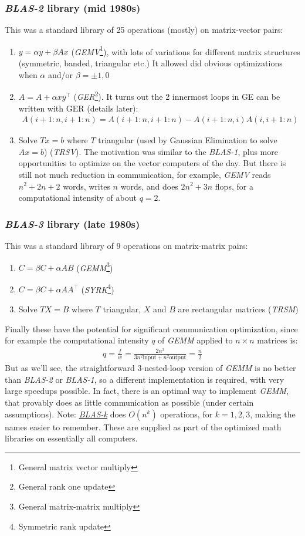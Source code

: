 \documentclass[11pt]{article}
\numberwithin{equation}{section}
\begin{document}
\subsubsection{\textit{BLAS-2} library (mid 1980s)}
This was a standard library of 25 operations (mostly) on matrix-vector pairs:\begin{enumerate}
    \item $y=\alpha y+\beta A x$ (\textit{GEMV}\footnote{General matrix vector multiply}), with lots of variations for different matrix structures (symmetric, banded, triangular etc.) It allowed did obvious optimizations when $\alpha$ and/or $\beta = \pm 1,0$
    \item $A=A+\alpha xy^\top$ (\textit{GER}\footnote{General rank one update}). It turns out the 2 innermost loops in GE can be written with GER (details later): \begin{align*}
        A(i+1:n,i+1:n) = A(i+1:n,i+1:n) - A(i+1:n,i) A(i,i+1:n)
    \end{align*}
    \item Solve $Tx=b$ where $T$ triangular (used by Gaussian Elimination to solve $Ax=b$) (\textit{TRSV}). The motivation was similar to the \textit{BLAS-1}, plus more opportunities to optimize on the vector computers of the day. But there is still not much reduction in communication, 
    for example, \textit{GEMV} reads $n^2+2n+2$ words, writes $n$ words, and does $2n^2+3n$ flops, for a computational intensity of about $q=2$.
\end{enumerate}

\subsubsection{\textit{BLAS-3} library (late 1980s)}
This was a standard library of 9 operations on matrix-matrix pairs: \begin{enumerate}
    \item $C=\beta C+\alpha AB$ (\textit{GEMM}\footnote{General matrix-matrix multiply})
    \item $C=\beta C+\alpha AA^\top$ (\textit{SYRK}\footnote{Symmetric rank update})
    \item Solve $TX=B$ where $T$ triangular, $X$ and $B$ are rectangular matrices (\textit{TRSM})
\end{enumerate}
Finally these have the potential for significant communication optimization, since for example the computational intensity $q$ of \textit{GEMM} applied to $n \times n$ matrices is: \begin{align*}
    q = \frac{f}{w} = \frac{2n^3}{3n^2 \mathrm{input} + n^2 \mathrm{output}} = \frac{n}{2}
\end{align*}
But as we'll see, the straightforward 3-nested-loop version of \textit{GEMM} is no better than \textit{BLAS-2} or \textit{BLAS-1}, 
so a different implementation is required, with very large speedups possible. In fact, there is an optimal way to implement \textit{GEMM}, 
that provably does as little communication as possible (under certain assumptions).
Note: \href{www.netlib.org/blas}{\textit{BLAS-k}} does $O(n^k)$ operations, for $k=1,2,3$, making the names easier to remember. These are supplied as part of the optimized math libraries on essentially all computers.
 
\end{document}
